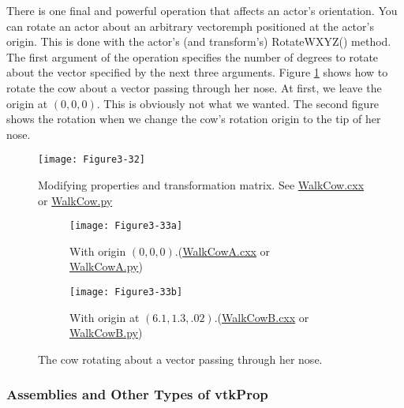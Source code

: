 There is one final and powerful operation that affects an actor's orientation. You can rotate an actor about an arbitrary vectoremph positioned at the actor's origin. This is done with the actor's (and transform's) RotateWXYZ() method. The first argument of the operation specifies the number of degrees to rotate about the vector specified by the next three arguments. Figure \ref{fig:Figure3-32} shows how to rotate the cow about a vector passing through her nose. At first, we leave the origin at $(0,0,0)$. This is obviously not what we wanted. The second figure shows the rotation when we change the cow's rotation origin to the tip of her nose.

\begin{figure}[!htb]
  \centering
  \texttt{[image: Figure3-32]}\\
  \caption{Modifying properties and transformation matrix. See \href{https://lorensen.github.io/VTKExamples/site/Cxx/Rendering/WalkCow/}{WalkCow.cxx} or \href{https://lorensen.github.io/VTKExamples/site/Python/Rendering/WalkCow/}{WalkCow.py}}\label{fig:Figure3-32}
\end{figure}

\begin{figure}
\begin{subfigure}[h]{0.48\linewidth}
\texttt{[image: Figure3-33a]}
\caption{With origin $(0,0,0)$.(\href{https://lorensen.github.io/VTKExamples/site/Cxx/Rendering/WalkCowA/}{WalkCowA.cxx} or \href{https://lorensen.github.io/VTKExamples/site/Python/Rendering/WalkCowA/}{WalkCowA.py})}
\end{subfigure}
\hfill
\begin{subfigure}[h]{0.48\linewidth}
\texttt{[image: Figure3-33b]}
\caption{With origin at $(6.1,1.3,.02)$.(\href{https://lorensen.github.io/VTKExamples/site/Cxx/Rendering/WalkCowB/}{WalkCowB.cxx} or \href{https://lorensen.github.io/VTKExamples/site/Python/Rendering/WalkCowB/}{WalkCowB.py})}
\end{subfigure}%
\caption{The cow rotating about a vector passing through her nose.}
\end{figure}

\subsubsection{Assemblies and Other Types of vtkProp}
\label{subsubsec:assemblies_vtkprop}

